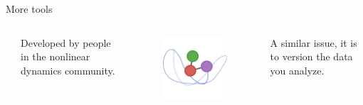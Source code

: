 \documentclass[9pt]{beamer}
\begin{document}
\begin{frame}{More tools}
\begin{columns}
\begin{column}{0.5\textwidth}
            \begin{columns}
                \begin{column}{0.1\textwidth}
                \end{column}
                \begin{column}{0.6\textwidth}
                    Developed by people in the nonlinear dynamics community.
                \end{column}
                \begin{column}{0.3\textwidth}
                    \begin{figure}
                        \centering
                        \href{https://juliadynamics.github.io/JuliaDynamics/}{
                            \includegraphics[width=0.9\hsize]{julia-dynamics}
                        }
                    \end{figure}
                \end{column}
            \end{columns}
        \end{column}
        \begin{column}{0.5\textwidth}
            \vspace*{10pt}

            A similar issue, it is to version the data you analyze.
            \vspace*{5pt}


\end{column}
\end{columns}
\end{frame}
\end{document}
